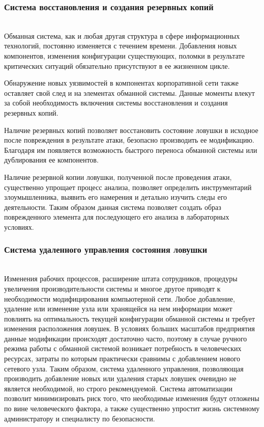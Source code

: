 \subsubsection{Система восстановления и создания резервных копий}\hspace*{\fill} \\

Обманная система, как и любая другая структура в сфере информационных технологий, постоянно изменяется с течением времени. Добавления новых компонентов, изменения конфигурации существующих, поломки в результате критических ситуаций обязательно присутствуют в ее жизненном цикле.

Обнаружение новых уязвимостей в компонентах корпоративной сети также оставляет свой след и на элементах обманной системы. Данные моменты влекут за собой необходимость включения системы восстановления и создания резервных копий. 

Наличие резервных копий позволяет восстановить состояние ловушки в исходное после повреждения в результате атаки, безопасно производить ее модификацию. Благодаря им появляется возможность быстрого переноса обманной системы или дублирования ее компонентов.

Наличие резервной копии ловушки, полученной после проведения атаки, существенно упрощает процесс анализа, позволяет определить инструментарий злоумышленника, выявить его намерения и детально изучить следы его деятельности. Таким образом данная система позволяет создать образ поврежденного элемента для последующего его анализа в лабораторных условиях.

\subsubsection{Система удаленного управления состояния ловушки}\hspace*{\fill} \\

Изменения рабочих процессов, расширение штата сотрудников, процедуры увеличения производительности системы и многое другое приводят к необходимости модифицирования компьютерной сети. Любое добавление, удаление или изменение узла или хранящейся на нем информации может повлиять на оптимальность текущей конфигурации обманной системы и требует изменения расположения ловушек. В условиях больших масштабов предприятия данные модификации происходят достаточно часто, поэтому в случае ручного режима работы с обманной системой возникает потребность в человеческих ресурсах, затраты по которым практически сравнимы с добавлением нового сетевого узла. Таким образом, система удаленного управления, позволяющая производить добавление новых или удаления старых ловушек очевидно не является необходимой, но строго рекомендуемой. Система автоматизации позволит минимизировать риск того, что необходимые изменения будут отложены по вине человеческого фактора, а также существенно упростит жизнь системному администратору и специалисту по безопасности.

